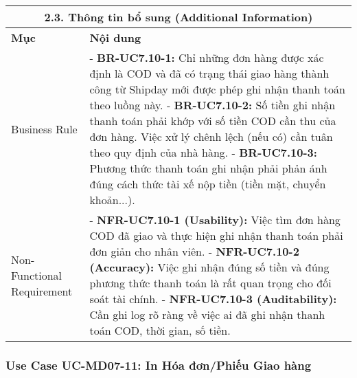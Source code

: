 \begin{longtable}{|m{4cm}|p{11cm}|}
\hline
\multicolumn{2}{|c|}{\textbf{2.3. Thông tin bổ sung (Additional Information)}} \\
\hline
\textbf{Mục} & \textbf{Nội dung} \\
\hline
Business Rule & - \textbf{BR-UC7.10-1:} Chỉ những đơn hàng được xác định là COD và đã có trạng thái giao hàng thành công từ Shipday mới được phép ghi nhận thanh toán theo luồng này. \newline - \textbf{BR-UC7.10-2:} Số tiền ghi nhận thanh toán phải khớp với số tiền COD cần thu của đơn hàng. Việc xử lý chênh lệch (nếu có) cần tuân theo quy định của nhà hàng. \newline - \textbf{BR-UC7.10-3:} Phương thức thanh toán ghi nhận phải phản ánh đúng cách thức tài xế nộp tiền (tiền mặt, chuyển khoản...). \\
\hline
Non-Functional Requirement & - \textbf{NFR-UC7.10-1 (Usability):} Việc tìm đơn hàng COD đã giao và thực hiện ghi nhận thanh toán phải đơn giản cho nhân viên. \newline - \textbf{NFR-UC7.10-2 (Accuracy):} Việc ghi nhận đúng số tiền và đúng phương thức thanh toán là rất quan trọng cho đối soát tài chính. \newline - \textbf{NFR-UC7.10-3 (Auditability):} Cần ghi log rõ ràng về việc ai đã ghi nhận thanh toán COD, thời gian, số tiền. \\
\hline
\end{longtable}

\subsubsection{Use Case UC-MD07-11: In Hóa đơn/Phiếu Giao hàng}

